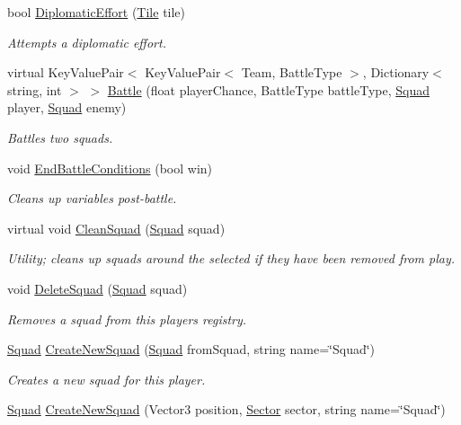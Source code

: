 \begin{DoxyCompactItemize}
bool \hyperlink{class_player_acec08dc9fb002e67a8f854d94af05550}{Diplomatic\+Effort} (\hyperlink{class_tile}{Tile} tile)
\begin{DoxyCompactList}\small\item\em Attempts a diplomatic effort. \end{DoxyCompactList}\item 
virtual Key\+Value\+Pair$<$ Key\+Value\+Pair$<$ Team, Battle\+Type $>$, Dictionary$<$ string, int $>$ $>$ \hyperlink{class_player_a69d2a97cac4e2f0831eda783c851cbd7}{Battle} (float player\+Chance, Battle\+Type battle\+Type, \hyperlink{class_squad}{Squad} player, \hyperlink{class_squad}{Squad} enemy)
\begin{DoxyCompactList}\small\item\em Battles two squads. \end{DoxyCompactList}\item 
void \hyperlink{class_player_ae056c6c5c7d80e459bcabd4231a32c8a}{End\+Battle\+Conditions} (bool win)
\begin{DoxyCompactList}\small\item\em Cleans up variables post-\/battle. \end{DoxyCompactList}\item 
virtual void \hyperlink{class_player_a7fdf09acf1c08b434350599981dcd078}{Clean\+Squad} (\hyperlink{class_squad}{Squad} squad)
\begin{DoxyCompactList}\small\item\em Utility; cleans up squads around the selected if they have been removed from play. \end{DoxyCompactList}\item 
void \hyperlink{class_player_a01265b89e1df1c43b291824eda3a3410}{Delete\+Squad} (\hyperlink{class_squad}{Squad} squad)
\begin{DoxyCompactList}\small\item\em Removes a squad from this player\textquotesingle{}s registry. \end{DoxyCompactList}\item 
\hyperlink{class_squad}{Squad} \hyperlink{class_player_a7fbef0af9e6f977f7097dfec45365554}{Create\+New\+Squad} (\hyperlink{class_squad}{Squad} from\+Squad, string name=\char`\"{}Squad\char`\"{})
\begin{DoxyCompactList}\small\item\em Creates a new squad for this player. \end{DoxyCompactList}\item 
\hyperlink{class_squad}{Squad} \hyperlink{class_player_a027795b9b4606910ca9c4eaf2cba243d}{Create\+New\+Squad} (Vector3 position, \hyperlink{class_sector}{Sector} sector, string name=\char`\"{}Squad\char`\"{})

\end{DoxyCompactItemize}
